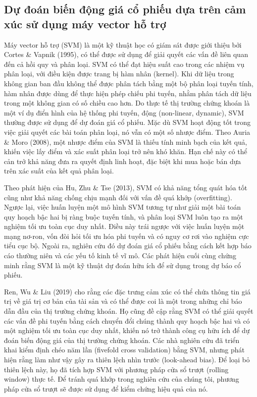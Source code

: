 \subsection*{Dự đoán biến động giá cổ phiếu dựa trên cảm xúc sử dụng máy vector hỗ trợ}

Máy vector hỗ trợ (SVM) là một kỹ thuật học có giám sát được giới thiệu bởi Cortes \& Vapnik (1995), có thể được sử dụng để giải quyết các vấn đề liên quan đến cả hồi quy và phân loại. SVM có thể đạt hiệu suất cao trong các nhiệm vụ phân loại, với điều kiện được trang bị hàm nhân (kernel). Khi dữ liệu trong không gian ban đầu không thể được phân tách bằng một bộ phân loại tuyến tính, hàm nhân được dùng để thực hiện phép chiếu phi tuyến, nhằm phân tách dữ liệu trong một không gian có số chiều cao hơn. Do thực tế thị trường chứng khoán là một ví dụ điển hình của hệ thống phi tuyến, động (non-linear, dynamic), SVM thường được sử dụng để dự đoán giá cổ phiếu. Mặc dù SVM hoạt động tốt trong việc giải quyết các bài toán phân loại, nó vẫn có một số nhược điểm. Theo Auria \& Moro (2008), một nhược điểm của SVM là thiếu tính minh bạch của kết quả, khiến việc lấy điểm và xác suất phân loại trở nên khó khăn. Hạn chế này có thể cản trở khả năng đưa ra quyết định linh hoạt, đặc biệt khi mua hoặc bán dựa trên xác suất của kết quả phân loại.

Theo phát hiện của Hu, Zhu \& Tse (2013), SVM có khả năng tổng quát hóa tốt cũng như khả năng chống chịu mạnh đối với vấn đề quá khớp (overfitting). Ngược lại, việc huấn luyện một mô hình SVM tương tự như giải một bài toán quy hoạch bậc hai bị ràng buộc tuyến tính, và phân loại SVM luôn tạo ra một nghiệm tối ưu toàn cục duy nhất. Điều này trái ngược với việc huấn luyện một mạng nơ-ron, vốn đòi hỏi tối ưu hóa phi tuyến và có nguy cơ rơi vào nghiệm cực tiểu cục bộ. Ngoài ra, nghiên cứu đó dự đoán giá cổ phiếu bằng cách kết hợp báo cáo thường niên và các yếu tố kinh tế vĩ mô. Các phát hiện cuối cùng chứng minh rằng SVM là một kỹ thuật dự đoán hữu ích để sử dụng trong dự báo cổ phiếu.

Ren, Wu \& Liu (2019) cho rằng các đặc trưng cảm xúc có thể chứa thông tin giá trị về giá trị cơ bản của tài sản và có thể được coi là một trong những chỉ báo dẫn đầu của thị trường chứng khoán. Họ cũng đề cập rằng SVM có thể giải quyết các vấn đề phi tuyến bằng cách chuyển đổi chúng thành quy hoạch bậc hai và có một nghiệm tối ưu toàn cục duy nhất, khiến nó trở thành công cụ hữu ích để dự đoán biến động giá của thị trường chứng khoán. Các nhà nghiên cứu đã triển khai kiểm định chéo năm lần (fivefold cross validation) bằng SVM, nhưng phát hiện rằng làm như vậy gây ra thiên lệch nhìn trước (look-ahead bias). Để loại bỏ thiên lệch này, họ đã tích hợp SVM với phương pháp cửa sổ trượt (rolling window) thực tế. Để tránh quá khớp trong nghiên cứu của chúng tôi, phương pháp cửa sổ trượt sẽ được sử dụng để kiểm chứng hiệu quả của nó.

